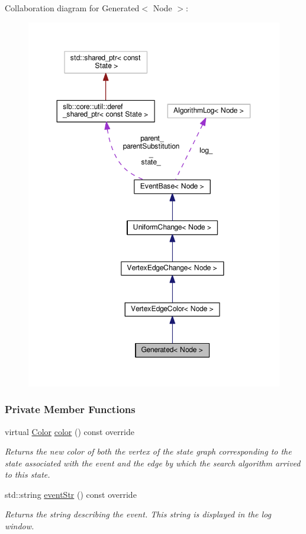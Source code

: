 Collaboration diagram for Generated$<$ Node $>$\+:\nopagebreak
\begin{figure}[H]
\begin{center}
\leavevmode
\includegraphics[width=350pt]{structGenerated__coll__graph}
\end{center}
\end{figure}
\subsubsection*{Private Member Functions}
\begin{DoxyCompactItemize}
\item 
virtual \hyperlink{colors_8h_ab87bacfdad76e61b9412d7124be44c1c}{Color} \hyperlink{structGenerated_a33e09cd8c34ffdf6e3f94717d02335fc}{color} () const override
\begin{DoxyCompactList}\small\item\em Returns the new color of both the vertex of the state graph corresponding to the state associated with the event and the edge by which the search algorithm arrived to this state. \end{DoxyCompactList}\item 
std\+::string \hyperlink{structGenerated_af8d9dfefbb901b0b104021d7dbd82d3c}{event\+Str} () const override
\begin{DoxyCompactList}\small\item\em Returns the string describing the event. This string is displayed in the log window. \end{DoxyCompactList}\end{DoxyCompactItemize}
